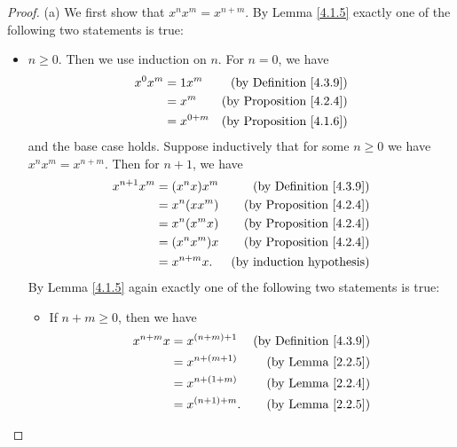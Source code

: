 \begin{proof}{(a)}
    We first show that \(x^n x^m = x^{n + m}\).
    By Lemma \ref{4.1.5} exactly one of the following two statements is true:
    \begin{itemize}
        \item \(n \geq 0\).
              Then we use induction on \(n\).
              For \(n = 0\), we have
              \begin{align*}
                  x^0 x^m & = 1x^m      & \text{(by Definition \ref{4.3.9})}  \\
                          & = x^m       & \text{(by Proposition \ref{4.2.4})} \\
                          & = x^{0 + m} & \text{(by Proposition \ref{4.1.6})}
              \end{align*}
              and the base case holds.
              Suppose inductively that for some \(n \geq 0\) we have \(x^n x^m = x^{n + m}\).
              Then for \(n + 1\), we have
              \begin{align*}
                  x^{n + 1} x^m & = (x^n x) x^m  & \text{(by Definition \ref{4.3.9})}  \\
                                & = x^n (x x^m)  & \text{(by Proposition \ref{4.2.4})} \\
                                & = x^n (x^m x)  & \text{(by Proposition \ref{4.2.4})} \\
                                & = (x^n x^m) x  & \text{(by Proposition \ref{4.2.4})} \\
                                & = x^{n + m} x. & \text{(by induction hypothesis)}
              \end{align*}
              By Lemma \ref{4.1.5} again exactly one of the following two statements is true:
              \begin{itemize}
                  \item If \(n + m \geq 0\), then we have
                        \begin{align*}
                            x^{n + m} x & = x^{(n + m) + 1}  & \text{(by Definition \ref{4.3.9})} \\
                                        & = x^{n + (m + 1)}  & \text{(by Lemma \ref{2.2.5})}      \\
                                        & = x^{n + (1 + m)}  & \text{(by Lemma \ref{2.2.4})}      \\
                                        & = x^{(n + 1) + m}. & \text{(by Lemma \ref{2.2.5})}

\end{align*}
\end{itemize}
\end{itemize}
\end{proof}
